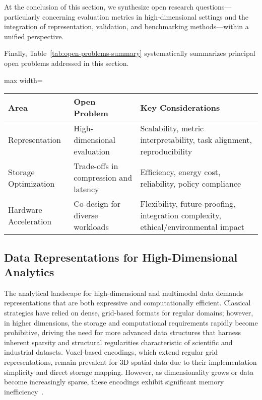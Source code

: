 \documentclass[sigconf]{acmart}
\begin{document}
At the conclusion of this section, we synthesize open research questions—particularly concerning evaluation metrics in high-dimensional settings and the integration of representation, validation, and benchmarking methods—within a unified perspective.

Finally, Table~\ref{tab:open-problems-summary} systematically summarizes principal open problems addressed in this section.

\begin{table*}[htbp]
\centering
\caption{Summary of principal open research challenges in data representation, storage optimization, and hardware acceleration.}
\label{tab:open-problems-summary}
\begin{adjustbox}{max width=\textwidth}
\begin{tabular}{@{}lll@{}}
\toprule
\textbf{Area} & \textbf{Open Problem} & \textbf{Key Considerations} \\
\midrule
Representation & High-dimensional evaluation & Scalability, metric interpretability, task alignment, reproducibility \\
Storage Optimization & Trade-offs in compression and latency & Efficiency, energy cost, reliability, policy compliance \\
Hardware Acceleration & Co-design for diverse workloads & Flexibility, future-proofing, integration complexity, ethical/environmental impact \\
\bottomrule
\end{tabular}
\end{adjustbox}
\end{table*}

\subsection{Data Representations for High-Dimensional Analytics}

The analytical landscape for high-dimensional and multimodal data demands representations that are both expressive and computationally efficient. Classical strategies have relied on dense, grid-based formats for regular domains; however, in higher dimensions, the storage and computational requirements rapidly become prohibitive, driving the need for more advanced data structures that harness inherent sparsity and structural regularities characteristic of scientific and industrial datasets. Voxel-based encodings, which extend regular grid representations, remain prevalent for 3D spatial data due to their implementation simplicity and direct storage mapping. However, as dimensionality grows or data become increasingly sparse, these encodings exhibit significant memory inefficiency~\cite{ref86}.
\end{document}
